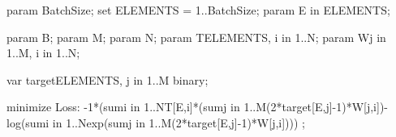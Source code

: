 param BatchSize;
set ELEMENTS = 1..BatchSize;
param E in ELEMENTS;

param B;
param M;
param N;
param T{ELEMENTS, i in 1..N};
param W{j in 1..M, i in 1..N};

var target{ELEMENTS, j in 1..M} binary;

minimize Loss:
	-1*(sum{i in 1..N}T[E,i]*(sum{j in 1..M}(2*target[E,j]-1)*W[j,i])-log(sum{i in 1..N}exp(sum{j in 1..M}(2*target[E,j]-1)*W[j,i]))) ;
	



	
